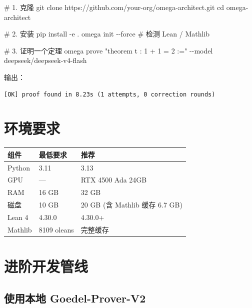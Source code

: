 \documentclass[
  11pt,
  a4paper,
]{ctexrep}
\newenvironment{Shaded}{\begin{snugshade}}{\end{snugshade}}
\newcommand{\AttributeTok}[1]{\textcolor[rgb]{0.40,0.45,0.13}{#1}}
\newcommand{\BuiltInTok}[1]{\textcolor[rgb]{0.00,0.23,0.31}{#1}}
\newcommand{\CommentTok}[1]{\textcolor[rgb]{0.37,0.37,0.37}{#1}}
\newcommand{\ExtensionTok}[1]{\textcolor[rgb]{0.00,0.23,0.31}{#1}}
\newcommand{\FunctionTok}[1]{\textcolor[rgb]{0.28,0.35,0.67}{#1}}
\newcommand{\NormalTok}[1]{\textcolor[rgb]{0.00,0.23,0.31}{#1}}
\newcommand{\StringTok}[1]{\textcolor[rgb]{0.13,0.47,0.30}{#1}}
\newcounter{none} %
\begin{document}
\begin{Shaded}
\begin{Highlighting}[]
\CommentTok{\# 1. 克隆}
\FunctionTok{git}\NormalTok{ clone https://github.com/your{-}org/omega{-}architect.git}
\BuiltInTok{cd}\NormalTok{ omega{-}architect}

\CommentTok{\# 2. 安装}
\ExtensionTok{pip}\NormalTok{ install }\AttributeTok{{-}e}\NormalTok{ .}
\ExtensionTok{omega}\NormalTok{ init }\AttributeTok{{-}{-}force}   \CommentTok{\# 检测 Lean / Mathlib}

\CommentTok{\# 3. 证明一个定理}
\ExtensionTok{omega}\NormalTok{ prove }\StringTok{"theorem t : 1 + 1 = 2 :="} \AttributeTok{{-}{-}model}\NormalTok{ deepseek/deepseek{-}v4{-}flash}
\end{Highlighting}
\end{Shaded}

输出：

\begin{verbatim}
[OK] proof found in 8.23s (1 attempts, 0 correction rounds)
\end{verbatim}

\section{环境要求}\label{sec-requirements}

{\def\LTcaptype{none} %
\begin{longtable}[]{@{}lll@{}}
\toprule\noalign{}
组件 & 最低要求 & 推荐 \\
\midrule\noalign{}
\endhead
\bottomrule\noalign{}
\endlastfoot
Python & 3.11 & 3.13 \\
GPU & --- & RTX 4500 Ada 24GB \\
RAM & 16 GB & 32 GB \\
磁盘 & 10 GB & 20 GB (含 Mathlib 缓存 6.7 GB) \\
Lean 4 & 4.30.0 & 4.30.0+ \\
Mathlib & 8109 oleans & 完整缓存 \\
\end{longtable}
}

\section{进阶开发管线}\label{sec-advanced}

\subsection{使用本地
Goedel-Prover-V2}\label{ux4f7fux7528ux672cux5730-goedel-prover-v2}
\end{document}
